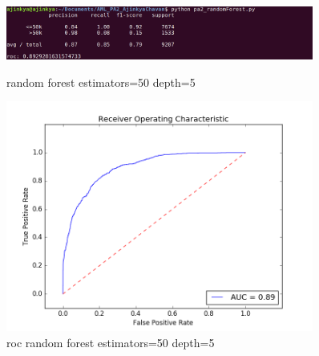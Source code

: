 \documentclass{article}
\begin{document}
\begin{figure}
    \centering
    \begin{minipage}{0.45\textwidth}
        \centering
        \includegraphics[width=0.9\textwidth]{random_50_5.png} %
        \caption{random forest estimators=50 depth=5}
    \end{minipage}\hfill
    \begin{minipage}{0.45\textwidth}
        \centering
        \includegraphics[width=0.9\textwidth]{roc_random_50_5.png} %
        \caption{roc random forest estimators=50 depth=5}
    \end{minipage}
\end{figure}
\end{document}
